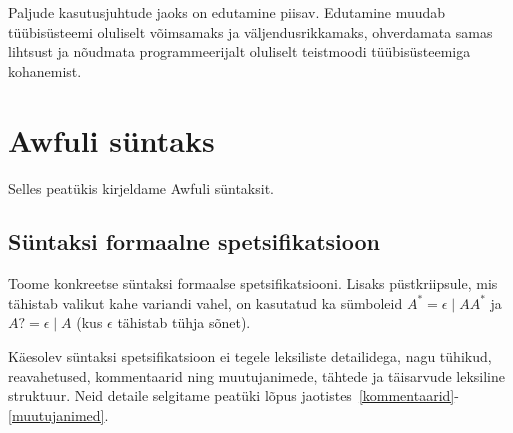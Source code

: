 \documentclass[12pt]{article}
\newcommand\peatykk[1]{
  \clearpage
  \section{#1}}
\begin{document}
      Paljude kasutusjuhtude jaoks on edutamine piisav. Edutamine muudab tüübisüsteemi oluliselt võimsamaks ja väljendusrikkamaks, ohverdamata samas lihtsust ja nõudmata programmeerijalt oluliselt teistmoodi tüübisüsteemiga kohanemist.
\begin{comment}
  \begin{frame}[fragile]{Promotion Without GADT-s?}
    Many GADT-s in the examples have a certain pattern:
    \begin{itemize}
      \item
        The kind of the new type constructor \verb!F! starts with \verb!K L1 ... Ln! where \verb!K! is a kind constructor promoted from an algebraic data type.
      \item
        The first type argument of the resulting \verb!F! is a type constructor applied to some type variables.
      \item
        For every constructor \verb!MakeK! of \verb!K!, we write exactly one data constructor. The first type argument of the resulting \verb!F! is constructed with \verb!MakeK!.
      \item
        For each data constructor that we create, the other type arguments of the resulting \verb!F! are type variables.
      \item
        All type variables used in the resulting \verb!F! are different.
    \end{itemize}
    The two examples shown that do not conform to this rule - \verb!Fin! and \verb!Sum! - can also be done by relaxing only the third rule (allowing zero or more than one data constructor of \verb!F! for each type constructor of \verb!K!).
\end{comment}
  \peatykk{Awfuli süntaks}\label{syntaks}
    Selles peatükis kirjeldame Awfuli süntaksit.
    \subsection{Süntaksi formaalne spetsifikatsioon}
    Toome konkreetse süntaksi formaalse spetsifikatsiooni. Lisaks püstkriipsule, mis tähistab valikut kahe variandi vahel, on kasutatud ka sümboleid $A^*=\epsilon\mid AA^*$ ja $A?=\epsilon\mid A$ (kus $\epsilon$ tähistab tühja sõnet).

    Käesolev süntaksi spetsifikatsioon ei tegele leksiliste detailidega, nagu tühikud, reavahetused, kommentaarid ning muutujanimede, tähtede ja täisarvude leksiline struktuur. Neid detaile selgitame peatüki lõpus jaotistes~\ref{kommentaarid}-\ref{muutujanimed}.
\end{document}
